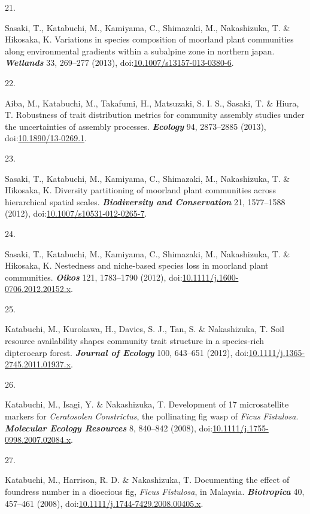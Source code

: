 \documentclass[
]{article}
\newlength{\cslhangindent}
\newlength{\csllabelwidth}
\newlength{\cslentryspacingunit} %
\newenvironment{CSLReferences}[2] %
 {%
  \setlength{\parindent}{0pt}
  \ifodd #1
  \let\oldpar\par
  \def\par{\hangindent=\cslhangindent\oldpar}
  \fi
  \setlength{\parskip}{#2\cslentryspacingunit}
 }%
 {}
\newcommand{\CSLLeftMargin}[1]{\parbox[t]{\csllabelwidth}{#1}}
\newcommand{\CSLRightInline}[1]{\parbox[t]{\linewidth - \csllabelwidth}{#1}\break}
\begin{document}
\begin{CSLReferences}{0}{0}
\leavevmode{}%
\CSLLeftMargin{21. }%
\CSLRightInline{Sasaki, T., Katabuchi, M., Kamiyama, C., Shimazaki, M.,
Nakashizuka, T. \& Hikosaka, K. Variations in species composition of
moorland plant communities along environmental gradients within a
subalpine zone in northern japan. \textbf{\emph{Wetlands}} 33, 269--277
(2013),
doi:\href{https://doi.org/10.1007/s13157-013-0380-6}{10.1007/s13157-013-0380-6}.}

\leavevmode{}%
\CSLLeftMargin{22. }%
\CSLRightInline{Aiba, M., Katabuchi, M., Takafumi, H., Matsuzaki, S. I.
S., Sasaki, T. \& Hiura, T. Robustness of trait distribution metrics for
community assembly studies under the uncertainties of assembly
processes. \textbf{\emph{Ecology}} 94, 2873--2885 (2013),
doi:\href{https://doi.org/10.1890/13-0269.1}{10.1890/13-0269.1}.}

\leavevmode{}%
\CSLLeftMargin{23. }%
\CSLRightInline{Sasaki, T., Katabuchi, M., Kamiyama, C., Shimazaki, M.,
Nakashizuka, T. \& Hikosaka, K. Diversity partitioning of moorland plant
communities across hierarchical spatial scales.
\textbf{\emph{Biodiversity and Conservation}} 21, 1577--1588 (2012),
doi:\href{https://doi.org/10.1007/s10531-012-0265-7}{10.1007/s10531-012-0265-7}.}

\leavevmode{}%
\CSLLeftMargin{24. }%
\CSLRightInline{Sasaki, T., Katabuchi, M., Kamiyama, C., Shimazaki, M.,
Nakashizuka, T. \& Hikosaka, K. Nestedness and niche-based species loss
in moorland plant communities. \textbf{\emph{Oikos}} 121, 1783--1790
(2012),
doi:\href{https://doi.org/10.1111/j.1600-0706.2012.20152.x}{10.1111/j.1600-0706.2012.20152.x}.}

\leavevmode{}%
\CSLLeftMargin{25. }%
\CSLRightInline{Katabuchi, M., Kurokawa, H., Davies, S. J., Tan, S. \&
Nakashizuka, T. Soil resource availability shapes community trait
structure in a species-rich dipterocarp forest. \textbf{\emph{Journal of
Ecology}} 100, 643--651 (2012),
doi:\href{https://doi.org/10.1111/j.1365-2745.2011.01937.x}{10.1111/j.1365-2745.2011.01937.x}.}

\leavevmode{}%
\CSLLeftMargin{26. }%
\CSLRightInline{Katabuchi, M., Isagi, Y. \& Nakashizuka, T. Development
of 17 microsatellite markers for {\emph{Ceratosolen}}{
\emph{Constrictus}}, the pollinating fig wasp of {\emph{Ficus}}{
\emph{Fistulosa}}. \textbf{\emph{Molecular Ecology Resources}} 8,
840--842 (2008),
doi:\href{https://doi.org/10.1111/j.1755-0998.2007.02084.x}{10.1111/j.1755-0998.2007.02084.x}.}

\leavevmode{}%
\CSLLeftMargin{27. }%
\CSLRightInline{Katabuchi, M., Harrison, R. D. \& Nakashizuka, T.
Documenting the effect of foundress number in a dioecious fig,
{\emph{Ficus}}{ \emph{Fistulosa}}, in {Malaysia}.
\textbf{\emph{Biotropica}} 40, 457--461 (2008),
doi:\href{https://doi.org/10.1111/j.1744-7429.2008.00405.x}{10.1111/j.1744-7429.2008.00405.x}.}

\end{CSLReferences}
\end{document}
